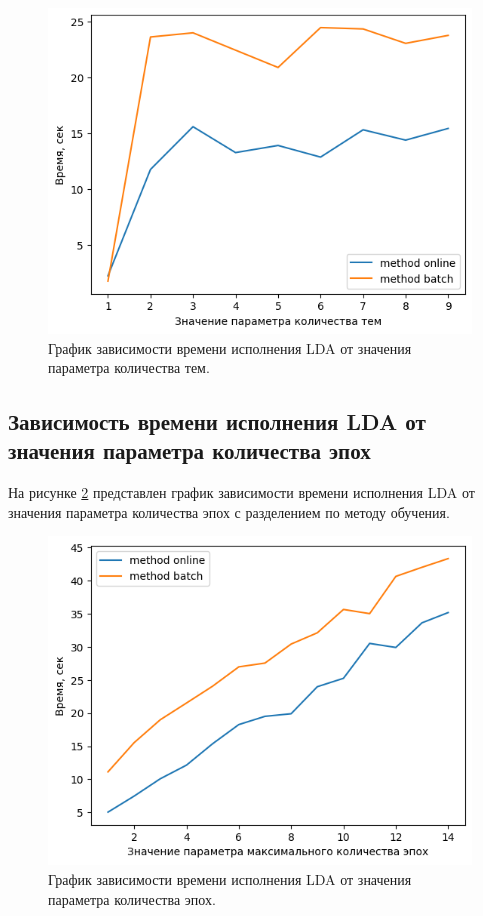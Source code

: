 \begin{figure}[H]
	\centering
	\includegraphics[width=\textwidth]{inc/timesTopicsLda.png}
	\caption{ График зависимости времени исполнения LDA от значения параметра количества тем.}
	\label{img:time3}
\end{figure}

\subsection{Зависимость времени исполнения LDA от значения параметра количества эпох}

На рисунке \ref{img:time4} представлен график зависимости времени исполнения LDA от значения параметра количества эпох с разделением по методу обучения.

\begin{figure}[H]
	\centering
	\includegraphics[width=\textwidth]{inc/timesEpochesLda.png}
	\caption{ График зависимости времени исполнения LDA от значения параметра количества эпох.}
	\label{img:time4}
\end{figure}

